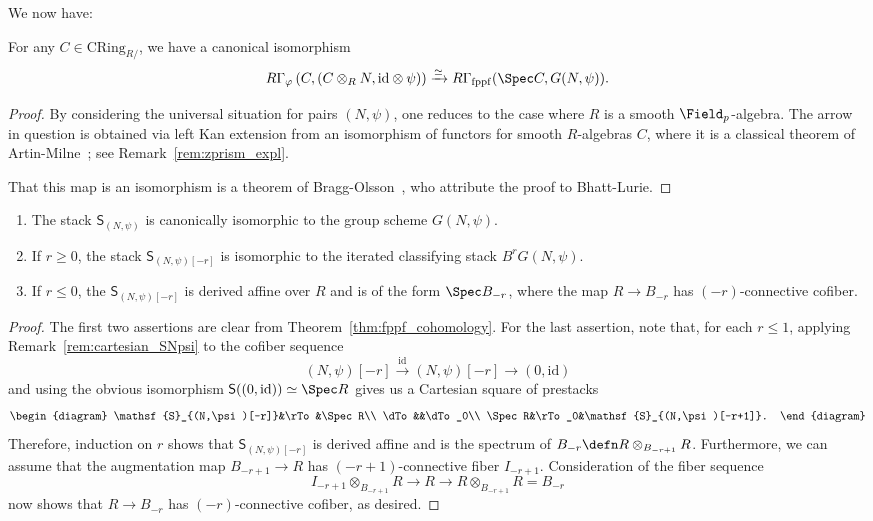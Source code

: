 \documentclass[10pt]{amsart}
\begin{document}
We now have:
\begin{theorem}
\label{thm:fppf_cohomology}
For any $C\in \mathrm{CRing}_{R/}$, we have a canonical isomorphism
\[
R\Gamma_\varphi\left(C,(C\otimes_RN,\mathrm{id}\otimes\psi)\right)\xrightarrow{\simeq}R\Gamma_{\mathrm{fppf}}(\Spec C,G(N,\psi)).
\]
\end{theorem}



\begin{proof}
By considering the universal situation for pairs $(N,\psi)$, one reduces to the case where $R$ is a smooth $\Field_p$-algebra. The arrow in question is obtained via left Kan extension from an isomorphism of functors for smooth $R$-algebras $C$, where it is a classical theorem of Artin-Milne~\cite[Proposition 2.4]{artin_milne}; see Remark~\ref{rem:zprism_expl}. 

That this map is an isomorphism is a theorem of Bragg-Olsson~\cite[Theorem 4.8]{bragg2021representability}, who attribute the proof to Bhatt-Lurie.
\end{proof}

\begin{corollary}
\label{cor:fppf_cohomology}
\begin{enumerate}
   \item The stack $\mathsf{S}_{(N,\psi)}$ is canonically isomorphic to the group scheme $G(N,\psi)$.
   \item If $r\ge 0$, the stack $\mathsf{S}_{(N,\psi)[-r]}$ is isomorphic to the iterated classifying stack $B^rG(N,\psi)$.
   \item If $r\leq 0$, the $\mathsf{S}_{(N,\psi)[-r]}$ is derived affine over $R$ and is of the form $\Spec B_{-r}$, where the map $R\to B_{-r}$ has $(-r)$-connective cofiber.
\end{enumerate}

\end{corollary}
\begin{proof}
The first two assertions are clear from Theorem~\ref{thm:fppf_cohomology}. For the last assertion, note that, for each $r\leq 1$, applying Remark~\ref{rem:cartesian_SNpsi} to the cofiber sequence
\[
(N,\psi)[-r]\xrightarrow{\mathrm{id}} (N,\psi)[-r]\to (0,\mathrm{id})
\]
and using the obvious isomorphism $\mathsf{S}((0,\mathrm{id}))\simeq \Spec R$ gives us a Cartesian square of prestacks
\[
\begin{diagram}
\mathsf{S}_{(N,\psi)[-r]}&\rTo&\Spec R\\
\dTo&&\dTo_0\\
\Spec R&\rTo_0&\mathsf{S}_{(N,\psi)[-r+1]}.
\end{diagram}
\]
Therefore, induction on $r$ shows that $\mathsf{S}_{(N,\psi)[-r]}$ is derived affine and is the spectrum of $B_{-r}\defn R\otimes_{B_{-r+1}}R$. Furthermore, we can assume that the augmentation map $B_{-r+1}\to R$ has $(-r+1)$-connective fiber $I_{-r+1}$. Consideration of the fiber sequence
\[
I_{-r+1}\otimes_{B_{-r+1}}R\to R \to  R\otimes_{B_{-r+1}}R = B_{-r}
\]
now shows that $R\to B_{-r}$ has $(-r)$-connective cofiber, as desired.
\end{proof}
\end{document}

